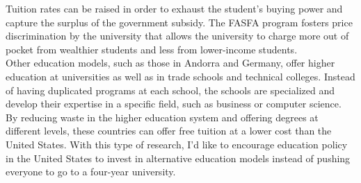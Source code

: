 \documentclass{article}
\begin{document}
Tuition rates can be raised in order to exhaust the student's buying power and capture the surplus of the government subsidy. 
The FASFA program fosters price discrimination by the university that allows the university to charge more out of pocket from wealthier students and less from lower-income students.\\
    Other education models, such as those in Andorra and Germany, offer higher education at universities as well as in trade schools and technical colleges.
    Instead of having duplicated programs at each school, the schools are specialized and develop their expertise in a specific field, such as business or computer science.
    By reducing waste in the higher education system and offering degrees at different levels, these countries can offer free tuition at a lower cost than the United States.
    With this type of research, I'd like to encourage education policy in the United States to invest in alternative education models instead of pushing everyone to go to a four-year university.



\end{document}
